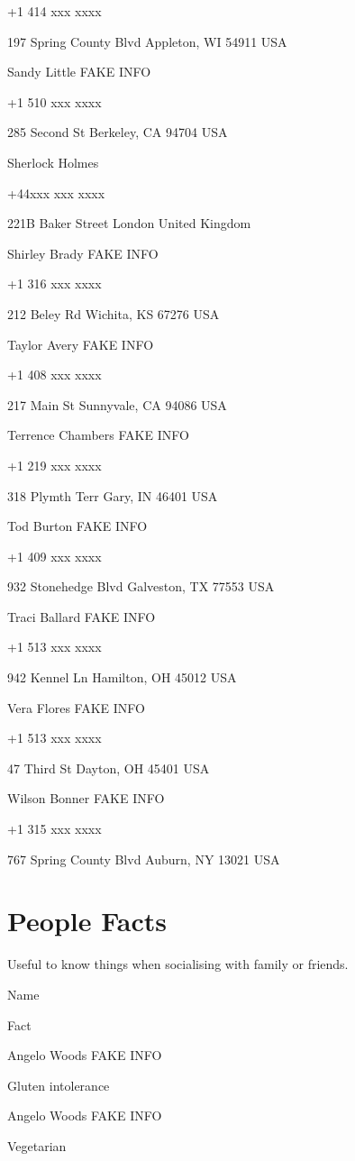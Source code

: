 \documentclass[]{book}
\theoremstyle{definition}
\theoremstyle{definition}
\theoremstyle{definition}
\theoremstyle{remark}
\begin{document}
+1 414 xxx xxxx

197 Spring County Blvd Appleton, WI 54911 USA

Sandy Little FAKE INFO

+1 510 xxx xxxx

285 Second St Berkeley, CA 94704 USA

Sherlock Holmes

+44xxx xxx xxxx

221B Baker Street London United Kingdom

Shirley Brady FAKE INFO

+1 316 xxx xxxx

212 Beley Rd Wichita, KS 67276 USA

Taylor Avery FAKE INFO

+1 408 xxx xxxx

217 Main St Sunnyvale, CA 94086 USA

Terrence Chambers FAKE INFO

+1 219 xxx xxxx

318 Plymth Terr Gary, IN 46401 USA

Tod Burton FAKE INFO

+1 409 xxx xxxx

932 Stonehedge Blvd Galveston, TX 77553 USA

Traci Ballard FAKE INFO

+1 513 xxx xxxx

942 Kennel Ln Hamilton, OH 45012 USA

Vera Flores FAKE INFO

+1 513 xxx xxxx

47 Third St Dayton, OH 45401 USA

Wilson Bonner FAKE INFO

+1 315 xxx xxxx

767 Spring County Blvd Auburn, NY 13021 USA

\chapter{People Facts}\label{people-facts}

Useful to know things when socialising with family or friends.

Name

Fact

Angelo Woods FAKE INFO

Gluten intolerance

Angelo Woods FAKE INFO

Vegetarian
\end{document}
